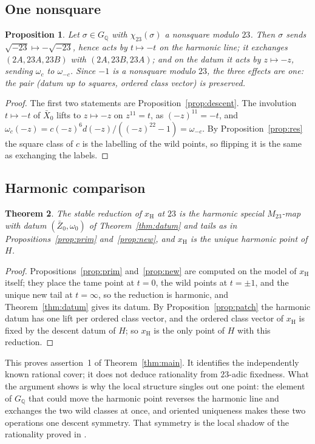 \documentclass[11pt]{amsart}
\newcommand{\QQ}{\mathbb{Q}}
\newcommand{\GQ}{G_{\QQ}}
\newcommand{\Mtw}{M_{23}}
\newcommand{\sqm}{\sqrt{-23}}
\newcommand{\xH}{x_{\mathrm H}}
\theoremstyle{plain}
\newtheorem{theorem}{Theorem}[section]
\newtheorem{proposition}[theorem]{Proposition}
\theoremstyle{definition}
\begin{document}
\subsection{One nonsquare}

\begin{proposition}\label{prop:nonsquare}
Let $\sigma\in\GQ$ with $\chi_{23}(\sigma)$ a nonsquare modulo $23$.
Then $\sigma$ sends $\sqm\mapsto-\sqm$, hence acts by $t\mapsto-t$ on
the harmonic line; it exchanges $(2A,23A,23B)$ with $(2A,23B,23A)$;
and on the datum it acts by $z\mapsto-z$, sending $\omega_c$ to
$\omega_{-c}$. Since $-1$ is a nonsquare modulo $23$, the three
effects are one: the pair (datum up to squares, ordered class vector)
is preserved.
\end{proposition}
\begin{proof}
The first two statements are Proposition~\ref{prop:descent}. The
involution $t\mapsto-t$ of $\bar X_0$ lifts to $z\mapsto-z$ on
$z^{11}=t$, as $(-z)^{11}=-t$, and
$\omega_c(-z)=c(-z)^6d(-z)/((-z)^{22}-1)=\omega_{-c}$. By
Proposition~\ref{prop:res} the square class of $c$ is the labelling of
the wild points, so flipping it is the same as exchanging the labels.
\end{proof}

\subsection{Harmonic comparison}

\begin{theorem}\label{thm:harmonic}
The stable reduction of $\xH$ at $23$ is the harmonic special
$\Mtw$-map with datum $(\bar Z_0,\omega_0)$ of Theorem~\ref{thm:datum}
and tails as in Propositions~\ref{prop:prim} and~\ref{prop:new}, and
$\xH$ is the unique harmonic point of $H$.
\end{theorem}
\begin{proof}
Propositions~\ref{prop:prim} and~\ref{prop:new} are computed on the
model of $\xH$ itself; they place the tame point at $t=0$, the wild
points at $t=\pm1$, and the unique new tail at $t=\infty$, so the
reduction is harmonic, and Theorem~\ref{thm:datum} gives its datum. By
Proposition~\ref{prop:patch} the harmonic datum has one lift per
ordered class vector, and the ordered class vector of $\xH$ is fixed
by the descent datum of $H$; so $\xH$ is the only point of $H$ with
this reduction.
\end{proof}

This proves assertion~1 of Theorem~\ref{thm:main}. It identifies the
independently known rational cover; it does not deduce rationality
from $23$-adic fixedness. What the argument shows is why the local
structure singles out one point: the element of $\GQ$ that could move
the harmonic point reverses the harmonic line and exchanges the two
wild classes at once, and oriented uniqueness makes these two
operations one descent symmetry. That symmetry is the local shadow of
the rationality proved in \cite{HJLPPZ}.
\end{document}

